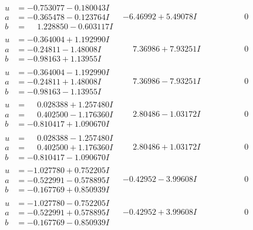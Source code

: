 \documentclass[1p]{elsarticle_modified}
\theoremstyle{definition}
\begin{document}
$$\begin{array}{c|c|c}
\begin{aligned}
u &= -0.753077 - 0.180043 I \\
a &= -0.365478 - 0.123764 I \\
b &= \phantom{-}1.228850 - 0.603117 I\end{aligned}
 & -6.46992 + 5.49078 I & \phantom{-0.000000 } 0 \\ \hline\begin{aligned}
u &= -0.364004 + 1.192990 I \\
a &= -0.24811 - 1.48008 I \\
b &= -0.98163 + 1.13955 I\end{aligned}
 & \phantom{-}7.36986 + 7.93251 I & \phantom{-0.000000 } 0 \\ \hline\begin{aligned}
u &= -0.364004 - 1.192990 I \\
a &= -0.24811 + 1.48008 I \\
b &= -0.98163 - 1.13955 I\end{aligned}
 & \phantom{-}7.36986 - 7.93251 I & \phantom{-0.000000 } 0 \\ \hline\begin{aligned}
u &= \phantom{-}0.028388 + 1.257480 I \\
a &= \phantom{-}0.402500 - 1.176360 I \\
b &= -0.810417 + 1.090670 I\end{aligned}
 & \phantom{-}2.80486 - 1.03172 I & \phantom{-0.000000 } 0 \\ \hline\begin{aligned}
u &= \phantom{-}0.028388 - 1.257480 I \\
a &= \phantom{-}0.402500 + 1.176360 I \\
b &= -0.810417 - 1.090670 I\end{aligned}
 & \phantom{-}2.80486 + 1.03172 I & \phantom{-0.000000 } 0 \\ \hline\begin{aligned}
u &= -1.027780 + 0.752205 I \\
a &= -0.522991 - 0.578895 I \\
b &= -0.167769 + 0.850939 I\end{aligned}
 & -0.42952 - 3.99608 I & \phantom{-0.000000 } 0 \\ \hline\begin{aligned}
u &= -1.027780 - 0.752205 I \\
a &= -0.522991 + 0.578895 I \\
b &= -0.167769 - 0.850939 I\end{aligned}
 & -0.42952 + 3.99608 I & \phantom{-0.000000 } 0\\

\end{array}$$
\end{document}

